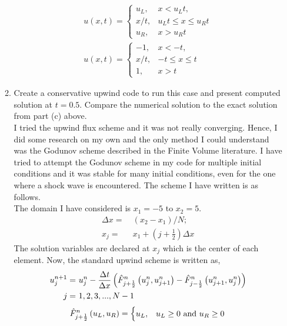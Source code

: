 \documentclass[11pt]{article}
\newcommand{\dx}{{\Delta x}}
\newcommand{\dt}{{\Delta t}}
\newcommand{\bra}[1]{\left(#1\right)}
\begin{document}
\begin{enumerate}
\begin{enumerate}
    \begin{align*}
        u(x,t) = 
        \begin{cases}
            u_L,  & x<u_L t, \\
            x/t, & u_Lt\leq x \leq u_R t \\
            u_R,   & x>u_R t
        \end{cases} \\
        u(x,t) = 
        \begin{cases}
            -1,  & x< -t, \\
            x/t, & -t\leq x \leq t \\
            1,   & x> t
        \end{cases}
    \end{align*}
    \item {\color{blue}Create a conservative upwind code to run this case and present computed solution at $t=0.5$. Compare the numerical solution to the exact solution from part (c) above.} \\
    I tried the upwind flux scheme and it was not really converging. Hence, I did some research on my own and the only method I could understand was the Godunov scheme described in the Finite Volume literature. I have tried to attempt the Godunov scheme in my code for multiple initial conditions and it was stable for many initial conditions, even for the one where a shock wave is encountered. The scheme I have written is as follows. \\
    The domain I have considered is $x_1=-5$ to $x_2=5$.
    \begin{align*}
        \dx =& \ (x_2-x_1)/N; \\
        x_j =& \ x_1 + (j+\frac{1}{2})\dx
    \end{align*}
    The solution variables are declared at $x_j$ which is the center of each element. Now, the standard upwind scheme is written as, 
    \begin{align*}
        u^{n+1}_j =& \ u^n_j - \frac{\dt}{\dx}\bra{\Hat{F}^{n}_{j+\frac{1}{2}}\bra{u^n_j,u^n_{j+1}} - \Hat{F}^n_{j-\frac{1}{2}}\bra{u^n_{j+1},u^n_j}} \\
        j =& \ 1,2,3,...,N-1
    \end{align*}
    \begin{align*}
        \Hat{F}^n_{j+\frac{1}{2}}\bra{u_L,u_R} = 
        \begin{cases}
            u_L, & u_L \geq 0\ \text{and}\ u_R \geq 0 \\

\end{cases}
\end{align*}
\end{enumerate}
\end{enumerate}
\end{document}
